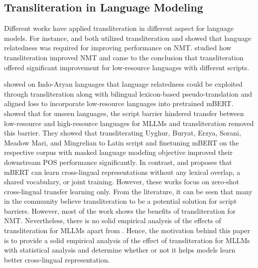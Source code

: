 \documentclass[11pt]{article}
\begin{document}
\subsection{Transliteration in Language Modeling}
\label{transliteration-model}
Different works have applied transliteration in different aspect for language models. For instance, \citet{goyal-etal-2020-efficient} and \citet{song-etal-2020-pre} both utilized transliteration and showed that language relatedness was required for improving performance on NMT. \citet{amrhein-sennrich-2020-romanization} studied how transliteration improved NMT and came to the conclusion that transliteration offered significant improvement for low-resource languages with different scripts. 

\citet{khemchandani-etal-2021-exploiting} showed on Indo-Aryan languages that language relatedness could be exploited through transliteration along with bilingual lexicon-based pseudo-translation and aligned loss to incorporate low-resource languages into pretrained mBERT. \citet{muller-etal-2021-unseen} showed that for unseen languages, the script barrier hindered transfer between low-resource and high-resource languages for MLLMs and transliteration removed this barrier. They showed that transliterating Uyghur, Buryat, Erzya, Sorani, Meadow Mari, and Mingrelian to Latin script and finetuning mBERT on the respective corpus with masked language modeling objective improved their downstream POS performance significantly. In contrast, \citet{DBLP:conf/iclr/KWMR20} and \citet{artetxe-etal-2020-cross} proposes that mBERT can learn cross-lingual representations without any lexical overlap, a shared vocabulary, or joint training. However, these works focus on zero-shot cross-lingual transfer learning only.
From the literature, it can be seen that many in the community believe transliteration to be a potential solution for script barriers. However, most of the work shows the benefits of transliteration for NMT. Nevertheless, there is no solid empirical analysis of the effects of transliteration for MLLMs apart from \citet{dhamecha-etal-2021-role,muller-etal-2021-unseen}. Hence, the motivation behind this paper is to provide a solid empirical analysis of the effect of transliteration for MLLMs with statistical analysis and determine whether or not it helps models learn better cross-lingual representation.
\end{document}
